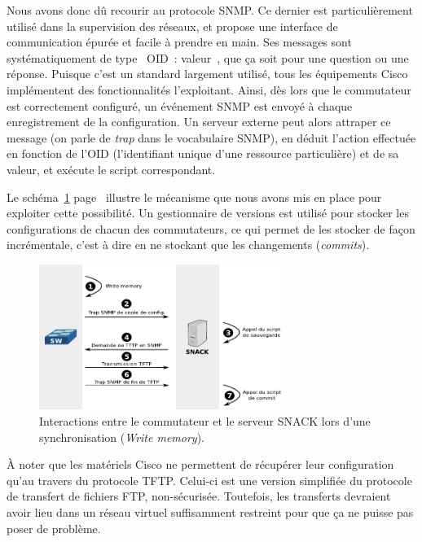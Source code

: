 Nous avons donc dû recourir au protocole SNMP. Ce dernier est particulièrement utilisé dans la supervision des réseaux, et propose une interface de communication épurée et facile à prendre en main. Ses messages sont systématiquement de type \og~OID~: valeur~\fg, que ça soit pour une question ou une réponse. Puisque c'est un standard largement utilisé, tous les équipements Cisco implémentent des fonctionnalités l'exploitant. Ainsi, dès lors que le commutateur est correctement configuré, un événement SNMP est envoyé à chaque enregistrement de la configuration. Un serveur externe peut alors attraper ce message (on parle de \emph{trap} dans le vocabulaire SNMP), en déduit l'action effectuée en fonction de l'OID (l'identifiant unique d'une ressource particulière) et de sa valeur, et exécute le script correspondant.

Le schéma~\ref{schema_wrmem} page~\pageref{schema_wrmem} illustre le mécanisme que nous avons mis en place pour exploiter cette possibilité. Un gestionnaire de versions est utilisé pour stocker les configurations de chacun des commutateurs, ce qui permet de les stocker de façon incrémentale, c'est à dire en ne stockant que les changements (\emph{commits}).

\begin{figure}[!h]
	\begin{center}
	    \includegraphics[width=0.7\textwidth]{img/wrmem.pdf}
	\end{center}
	\caption{Interactions entre le commutateur et le serveur SNACK lors d'une synchronisation (\emph{Write memory}).}
	\label{schema_wrmem}
\end{figure}

À noter que les matériels Cisco ne permettent de récupérer leur configuration qu'au travers du protocole TFTP. Celui-ci est une version simplifiée du protocole de transfert de fichiers FTP, non-sécurisée. Toutefois, les transferts devraient avoir lieu dans un réseau virtuel suffisamment restreint pour que ça ne puisse pas poser de problème.

